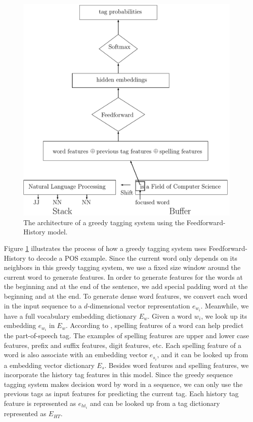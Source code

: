 \begin{figure}
  \centering
  \includegraphics[scale=0.6]{greedypos.pdf}
 \caption{The architecture of a greedy tagging system using the Feedforward-History model.}
  \label{fig:greedypos}
\end{figure}

Figure \ref{fig:greedypos} illustrates the process of how a greedy tagging system uses Feedforward-History to decode a POS example. Since the current word only depends on its neighbors in this greedy tagging system, we use a fixed size window around the current word to generate features. In order to generate features for the words at the beginning and at the end of the sentence, we add special padding word at the beginning and at the end. To generate dense word features, we convert each word in the input sequence to a $d$-dimensional vector representation $e_{w_{i}}$. Meanwhile, we have a full vocabulary embedding dictionary $E_{w}$. Given a word $w_{i}$, we look up its embedding $e_{w_{i}}$ in $E_{w}$. According to \cite{ratnaparkhi1996maximum}, spelling features of a word can help predict the part-of-speech tag. The examples of spelling features are upper and lower case features, prefix and suffix features, digit features, etc. Each spelling feature of a word is also associate with an embedding vector $e_{s_{i}}$, and it can be looked up from a embedding vector dictionary $E_{s}$. Besides word features and spelling features, we incorporate the history tag features in this model. Since the greedy sequence tagging system makes decision word by word in a sequence, we can only use the previous tags as input features for predicting the current tag. Each history tag feature is represented as $e_{ht_{i}}$ and can be looked up from a tag dictionary represented as $E_{HT}$.

